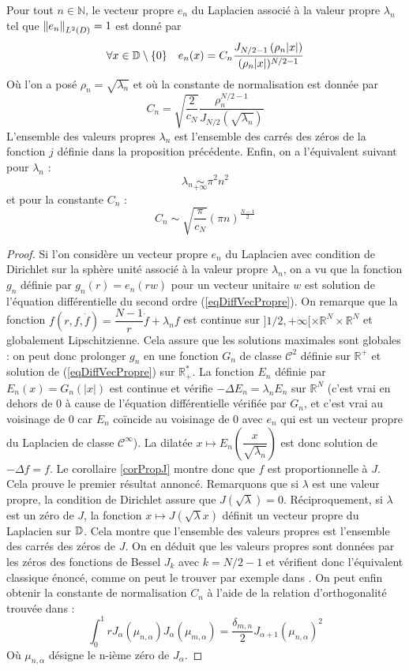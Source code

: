 \documentclass[11pt,a4paper]{article}
\begin{document}
\begin{Prop}
\label{ExpressionVecteursPropres}
Pour tout $n \in \mathbb{N}$, le vecteur propre $e_n$ du Laplacien associé à la valeur propre $\lambda_n$ tel que $\left\|e_n\right\|_{L^2(D)} = 1$ est donné par \[\forall x \in \mathbb{D} \setminus{\{0\}} \quad e_n(x) = C_n \dfrac{J_{N/2 - 1}\left(\rho_n|x|\right)}{(\rho_n|x|)^{N/2 - 1}}\] Où l'on a posé $\rho_n = \sqrt{\lambda_n}$ et où la constante de normalisation est donnée par \[C_n = \sqrt{\frac{2}{c_N}} \frac{\rho_n^{N/2-1}}{J_{N/2}\left(\sqrt{\lambda_n}\right)}\]
L'ensemble des valeurs propres $\lambda_n$ est l'ensemble des carrés des zéros de la fonction $j$ définie dans la proposition précédente. Enfin, on a l'équivalent suivant pour $\lambda_n$ : \[\lambda_n \underset{+\infty}{\sim} \pi^2 n^2\] et pour la constante $C_n$ : \[C_n \sim \sqrt{\dfrac{\pi}{c_N}}\left(\pi n\right)^{\frac{N-1}{2}} \]

\begin{proof}
Si l'on considère un vecteur propre $e_n$ du Laplacien avec condition de Dirichlet sur la sphère unité associé à la valeur propre $\lambda_n$, on a vu que la fonction $g_n$ définie par $g_n(r) = e_n(rw)$ pour un vecteur unitaire $w$ est solution de l'équation différentielle du second ordre (\ref{eqDiffVecPropre}). On remarque que la fonction $f(r,f,\dot{f}) = \dfrac{N-1}{r}\dot{f} + \lambda_n f$ est continue sur $]1/2,+\infty[\times \mathbb{R}^N \times \mathbb{R}^N $ et globalement Lipschitzienne. Cela assure que les solutions maximales sont globales : on peut donc prolonger $g_n$ en une fonction $G_n$ de classe $\mathcal{C}^2$ définie sur $\mathbb{R}^+$ et solution de (\ref{eqDiffVecPropre}) sur $\mathbb{R}_+^*$. La fonction $E_n$ définie par $E_n(x) = G_n(|x|)$ est continue et vérifie $-\Delta E_n = \lambda_n E_n$ sur $\mathbb{R}^N$ (c'est vrai en dehors de 0 à cause de l'équation différentielle vérifiée par $G_n$, et c'est vrai au voisinage de $0$ car $E_n$ coïncide au voisinage de $0$ avec $e_n$ qui est un vecteur propre du Laplacien de classe $\mathcal{C}^\infty$). La dilatée $x \mapsto E_n\left(\dfrac{x}{\sqrt{\lambda_n}}\right)$ est donc solution de $-\Delta f = f$. Le corollaire \ref{corPropJ} montre donc que $f$ est proportionnelle à $J$. Cela prouve le premier résultat annoncé. Remarquons que si $\lambda$ est une valeur propre, la condition de Dirichlet assure que $J(\sqrt{\lambda})=0$. Réciproquement, si $\lambda$ est un zéro de $J$, la fonction $x\mapsto J(\sqrt{\lambda}x)$ définit un vecteur propre du Laplacien sur $\mathbb{D}$. Cela montre que l'ensemble des valeurs propres est l'ensemble des carrés des zéros de $J$. On en déduit que les valeurs propres sont données par les zéros des fonctions de Bessel $J_k$ avec $k = N/2-1$ et vérifient donc l'équivalent classique énoncé, comme on peut le trouver par exemple dans \cite{WinNT}. On peut enfin obtenir la constante de normalisation $C_n$ à l'aide de la relation d'orthogonalité trouvée dans \cite{abramowitz1964handbook} : 
\[\int_0^1 r J_\alpha(\mu_{n,\alpha})J_\alpha(\mu_{m,\alpha}) = \dfrac{\delta_{m,n}}{2}J_{\alpha+1}(\mu_{n,\alpha})^2\]
Où $\mu_{n,\alpha}$ désigne le n-ième zéro de $J_{\alpha}$. 
\end{proof}

\end{Prop}
\end{document}
